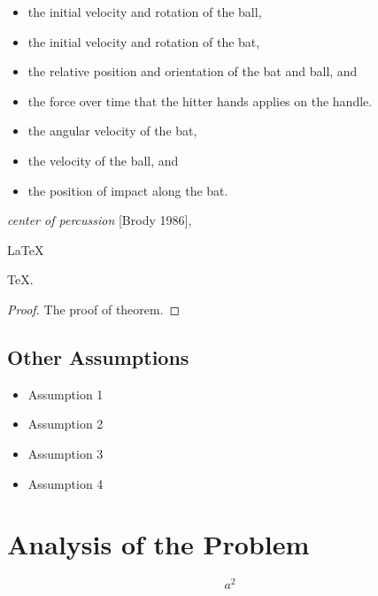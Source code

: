 \documentclass{mcmthesis}
\begin{document}
\begin{itemize}
\item the initial velocity and rotation of the ball,
\item the initial velocity and rotation of the bat,
\item the relative position and orientation of the bat and ball, and
\item the force over time that the hitter hands applies on the handle.
\end{itemize}
\lipsum[3]
\begin{itemize}
\item the angular velocity of the bat,
\item the velocity of the ball, and
\item the position of impact along the bat.
\end{itemize}
\lipsum[4]
\emph{center of percussion} [Brody 1986], \lipsum[5]

\begin{Theorem} \label{thm:latex}
\LaTeX
\end{Theorem}
\begin{Lemma} \label{thm:tex}
\TeX .
\end{Lemma}
\begin{proof}
The proof of theorem.
\end{proof}

\subsection{Other Assumptions}
\lipsum[6]
\begin{itemize}
\item Assumption 1
\item Assumption 2
\item Assumption 3
\item Assumption 4
\end{itemize}
\lipsum[7]

\section{Analysis of the Problem}

\lipsum[8] %
\begin{equation}
a^2 \tag{1} \label{aa}
\end{equation}
\end{document}
